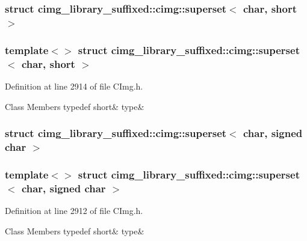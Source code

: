 \subsubsection{struct cimg\+\_\+library\+\_\+suffixed\+:\+:cimg\+:\+:superset$<$ char, short $>$}
\subsubsection*{template$<$$>$\newline
struct cimg\+\_\+library\+\_\+suffixed\+::cimg\+::superset$<$ char, short $>$}



Definition at line 2914 of file C\+Img.\+h.

\begin{DoxyFields}{Class Members}
\mbox{\label{namespacecimg__library__suffixed_1_1cimg_a18cfeaa6cbae4b2bb61cf681f88c3924}} 
typedef short&
type&
\\
\hline

\end{DoxyFields}
\label{structcimg__library__suffixed_1_1cimg_1_1superset_3_01char_00_01signed_01char_01_4}
\subsubsection{struct cimg\+\_\+library\+\_\+suffixed\+:\+:cimg\+:\+:superset$<$ char, signed char $>$}
\subsubsection*{template$<$$>$\newline
struct cimg\+\_\+library\+\_\+suffixed\+::cimg\+::superset$<$ char, signed char $>$}



Definition at line 2912 of file C\+Img.\+h.

\begin{DoxyFields}{Class Members}
\mbox{\label{namespacecimg__library__suffixed_1_1cimg_a524f73803bfd09dda3ccfc53ec93dd9c}} 
typedef short&
type&
\\
\hline

\end{DoxyFields}
\label{structcimg__library__suffixed_1_1cimg_1_1superset_3_01char_00_01unsigned_01char_01_4}
